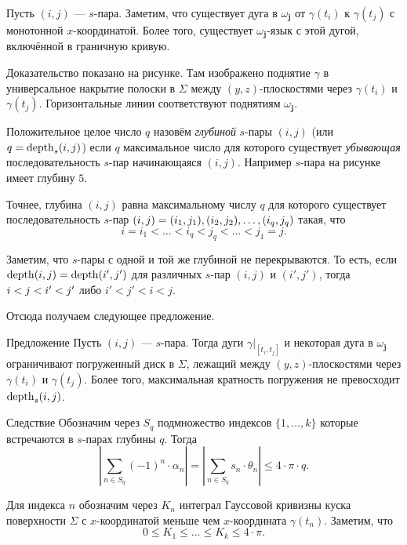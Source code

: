 \documentclass[a4paper,10pt]{article}
\begin{document}
Пусть $(i,j)$ --- $s$-пара.
Заметим, что существует дуга в $\omega_{\bm{j}}$ от $\gamma(t_i)$ к $\gamma(t_j)$
с монотонной $x$-координатой.
Более того, существует $\omega_{\bm{j}}$-язык с этой дугой, включённой в граничную кривую.

Доказательство показано на рисунке.
Там изображено поднятие $\gamma$ в универсальное накрытие полоски в $\Sigma$ между $(y,z)$-плоскостями через $\gamma(t_i)$ и $\gamma(t_j)$.
Горизонтальные линии соответствуют поднятиям $\omega_{\bm{j}}$.

Положительное целое число $q$
назовём \emph{глубиной} $s$-пары $(i,j)$ 
(или $q\zz=\depth_{s}(i,j)$) 
если $q$ максимальное число для которого существует \emph{убывающая} последовательность $s$-пар начинающаяся $(i,j)$.
Например $s$-пара на рисунке имеет глубину $5$.

Точнее, глубина $(i,j)$ равна максимальному числу $q$
для которого существует последовательность $s$-пар
$(i,j)=(i_1,j_1),(i_2,j_2),\zz\dots,(i_q,j_q)$ такая, что
\[i=i_1<\dots<i_q<j_q<\dots<j_1=j.\]


Заметим, что $s$-пары с одной и той же глубиной не перекрываются.
То есть, если $\mathop{\rm depth}\nolimits(i,j)=\mathop{\rm depth}\nolimits(i',j')$
для различных $s$-пар $(i,j)$ и $(i',j')$,
тогда $i\zz<j\zz<i'\zz<j'$ либо $i'<j'<i<j$.

Отсюда получаем следующее предложение.

\begin{thm}{Предложение}\label{prop:immersion}
Пусть $(i,j)$ --- $s$-пара.
Тогда дуги $\gamma|_{[t_i,t_j]}$ и некоторая дуга в $\omega_{\bm{j}}$ ограничивают погруженный диск в $\Sigma$, лежащий между $(y,z)$-плоскостями через $\gamma(t_i)$ и $\gamma(t_j)$.
Более того, максимальная кратность погружения не превосходит $\mathop{\rm depth}\nolimits_{s}(i,j)$.
\end{thm}


\begin{thm}{Следствие}\label{cor:Sq}
Обозначим через $S_q$ подмножество индексов $\{1,\dots,k\}$
которые встречаются в $s$-парах глубины $q$.
Тогда
\[\left|\sum_{n\in S_q}(-1)^n\cdot\alpha_n\right|
=\left|\sum_{n\in S_q}s_n\cdot\theta_n\right|
\le 4\cdot\pi\cdot q.\]
\end{thm}

 Для индекса $n$ обозначим через $K_n$ интеграл Гауссовой кривизны куска поверхности $\Sigma$ с $x$-координатой меньше чем $x$-координата $\gamma(t_n)$.
Заметим, что
\[0\le K_1\le\dots\le K_k\le 4\cdot\pi.\]
\end{document}
